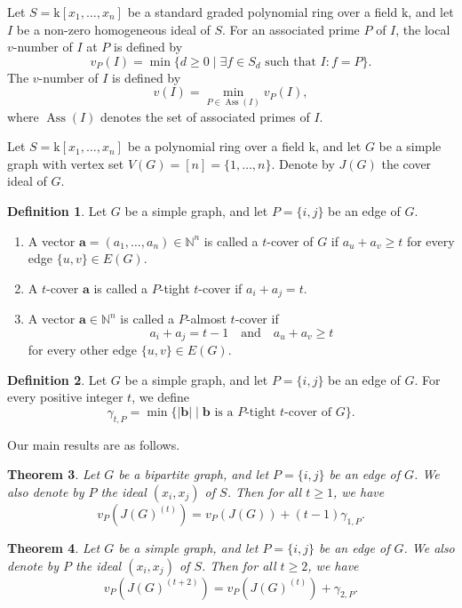 \documentclass[12pt,amscd]{amsart}
\newtheorem{thm}{Theorem}[section]
\theoremstyle{definition}
\newtheorem{defn}[thm]{Definition}
\numberwithin{equation}{section}
\DeclareMathOperator{\Ass}{Ass}
\def\k {\mathrm{k}}
\begin{document}
Let $S = \k[x_1, \ldots, x_n]$ be a standard graded polynomial ring over a field $\k$, and let $I$ be a non-zero homogeneous ideal of $S$. For an associated prime $P$ of $I$, the local $v$-number of $I$ at $P$ is defined by 
$$v_P(I) = \min \{d \ge 0 \mid \exists f \in S_d \text{ such that } I : f = P\}.$$
The $v$-number of $I$ is defined by
\[
v(I)=\min_{P\in\Ass(I)}v_P(I),
\]
where $\Ass(I)$ denotes the set of associated primes of $I$. 


Let $S=\k[x_1,\dots,x_n]$ be a polynomial ring over a field $\k$, and let $G$ be a simple graph with vertex set $V(G)=[n]=\{1,\ldots,n\}$. Denote by $J(G)$ the cover ideal of $G$. 
\begin{defn}
Let $G$ be a simple graph, and let $P=\{i,j\}$ be an edge of $G$. 
\begin{enumerate}
    \item A vector $\mathbf{a}=(a_1,\ldots,a_n)\in\mathbb{N}^n$ is called a $t$-cover of $G$ if $a_u+a_v\ge t$ for every edge $\{u,v\}\in E(G)$.
    \item A $t$-cover $\mathbf{a}$ is called a $P$-tight $t$-cover if $a_i+a_j=t$.
    \item A vector $\mathbf{a}\in\mathbb{N}^n$ is called a $P$-almost $t$-cover if
    \[
    a_i+a_j=t-1 \quad \text{and} \quad a_u+a_v\ge t
    \]
    for every other edge $\{u,v\}\in E(G)$.
\end{enumerate}
\end{defn}

\begin{defn}
Let $G$ be a simple graph, and let $P = \{i,j\}$ be an edge of $G$. For every positive integer $t$, we define 
$$\gamma_{t,P} = \min \{ |\mathbf{b}| \mid \mathbf{b} \text{ is a } P\text{-tight } t\text{-cover of } G \}.$$
\end{defn}

Our main results are as follows.

\begin{thm}\label{thm_local_bipartite} 
Let $G$ be a bipartite graph, and let $P = \{i,j\}$ be an edge of $G$. We also denote by $P$ the ideal $(x_i,x_j)$ of $S$. Then for all $t \ge 1$, we have 
$$v_P(J(G)^{(t)}) = v_P(J(G)) + (t-1)\gamma_{1,P}.$$
\end{thm}

\begin{thm}\label{thm_local_nonbipartite} 
Let $G$ be a simple graph, and let $P = \{i,j\}$ be an edge of $G$. We also denote by $P$ the ideal $(x_i,x_j)$ of $S$. Then for all $t \ge 2$, we have 
$$v_P(J(G)^{(t+2)}) = v_P(J(G)^{(t)}) + \gamma_{2,P}.$$
\end{thm}
\end{document}
